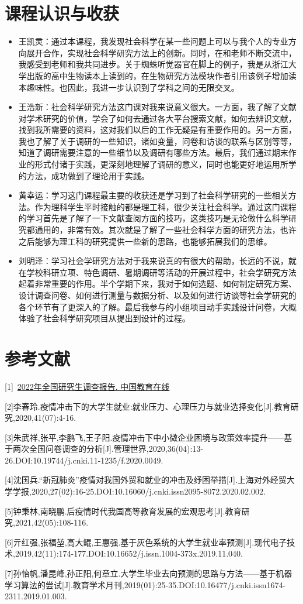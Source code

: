 \documentclass[a4paper]{IEEEtran}
\begin{document}
		\section{课程认识与收获}
		\begin{itemize}
			\item 王凯灵：通过本课程，我发现社会科学在某一些问题上可以与我个人的专业方向展开合作，实现社会科学研究方法上的创新。同时，在和老师不断交流中，我感受到老师和我共同进步。关于蜘蛛听觉器官在脚上的例子，我是从浙江大学出版的高中生物读本上读到的，在生物研究方法模块作者引用该例子增加读本趣味性。也因此，我进一步认识到了学科之间的无限交叉。
			\item 王浩新：社会科学研究方法这门课对我来说意义很大。一方面，我了解了文献对学术研究的价值，学会了如何去通过各大平台搜索文献，如何去辨识文献，找到我所需要的资料，这对我们以后的工作无疑是有重要作用的。另一方面，我也了解了关于调研的一些知识，诸如变量，问卷和访谈的联系与区别等等，知道了调研需要注意的一些细节以及调研有哪些方法。最后，我们通过期末作业的形式付诸于实践，更深刻地理解了调研的意义，同时也能更好地运用所学的方法，成功做到了理论用于实践。
			\item 黄幸运：学习这门课程最主要的收获还是学习到了社会科学研究的一些相关方法。作为理科学生平时接触的都是理工科，很少关注社会科学。通过这门课程的学习首先是了解了一下文献查阅方面的技巧，这类技巧是无论做什么科学研究都通用的，非常有效。其次就是了解了一些社会科学方面的研究方法，也许之后能够为理工科的研究提供一些新的思路，也能够拓展我们的思维。
			\item 刘明泽：学习社会学研究方法对于我来说真的有很大的帮助，长远的不说，就在学校科研立项、特色调研、暑期调研等活动的开展过程中，社会学研究方法起着非常重要的作用。半个学期下来，我对于如何选题、如何制定研究方案、设计调查问卷、如何进行测量与数据分析、以及如何进行访谈等社会学研究的各个环节有了更深入的了解。最后我参与的小组项目动手实践设计问卷，大概体验了社会科学研究项目从提出到设计的过程。
		\end{itemize}
	\section{参考文献}
	[1]~\href{https://www.eol.cn/e_ky/zt/report/2022/index.html}{2022年全国研究生调查报告. 中国教育在线}
	
	[2]李春玲.疫情冲击下的大学生就业:就业压力、心理压力与就业选择变化[J].教育研究,2020,41(07):4-16.
	
	[3]朱武祥,张平,李鹏飞,王子阳.疫情冲击下中小微企业困境与政策效率提升——基于两次全国问卷调查的分析[J].管理世界,2020,36(04):13-26.DOI:10.19744/j.cnki.11-1235/f.2020.0049.
	
	[4]沈国兵.“新冠肺炎”疫情对我国外贸和就业的冲击及纾困举措[J].上海对外经贸大学学报,2020,27(02):16-25.DOI:10.16060/j.cnki.issn2095-8072.2020.02.002.
	
	[5]钟秉林,南晓鹏.后疫情时代我国高等教育发展的宏观思考[J].教育研究,2021,42(05):108-116.
	
	[6]亓红强,张福堃,高大鲲,王惠强.基于灰色系统的大学生就业率预测[J].现代电子技术,2019,42(11):174-177.DOI:10.16652/j.issn.1004-373x.2019.11.040.
	
	[7]孙怡帆,潘昆峰,孙正阳,何章立.大学生毕业去向预测的思路与方法——基于机器学习算法的尝试[J].教育学术月刊,2019(01):25-35.DOI:10.16477/j.cnki.issn1674-2311.2019.01.003.
	
\end{document}
